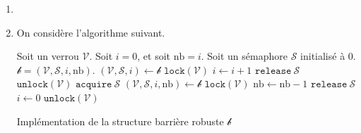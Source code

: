 \begin{enumerate}[start=5]
	\item 
	\item On considère l'algorithme suivant.
		\begin{algorithm}[H]
			\centering
			\begin{algorithmic}[1]
				\State Soit un verrou $\mathcal{V}$.
				\State Soit $i = 0$, et soit $\mathrm{nb} = i$.
				\State Soit un sémaphore $\mathcal{S}$ initialisé à $0$.
				\State\Return $\mathcal{b} = (\mathcal{V}, \mathcal{S}, i, \mathrm{nb})$.
				\EndProcedure
				\State $(\mathcal{V}, \mathcal{S}, i) \gets \mathcal{b}$
				\State $\texttt{lock}(\mathcal{V})$
				\State $i \gets i + 1$
				\State $\texttt{release}\ \mathcal{S}$
				\EndFor
				\EndIf
				\State $\texttt{unlock}(\mathcal{V})$
				\State $\texttt{acquire}\ \mathcal{S}$
				\EndProcedure
				\State $(\mathcal{V}, \mathcal{S}, i, \mathrm{nb}) \gets \mathcal{b}$
				\State $\texttt{lock}(\mathcal{V})$\/
				\State $\mathrm{nb} \gets \mathrm{nb} - 1$
				\State $\texttt{release}\ \mathcal{S}$
				\EndFor
				\State $i \gets 0$
				\EndIf
				\State $\texttt{unlock}(\mathcal{V})$
				\EndProcedure
			\end{algorithmic}
			\caption{Implémentation de la structure barrière robuste $\mathcal{b}$}
		\end{algorithm}
\end{enumerate}

